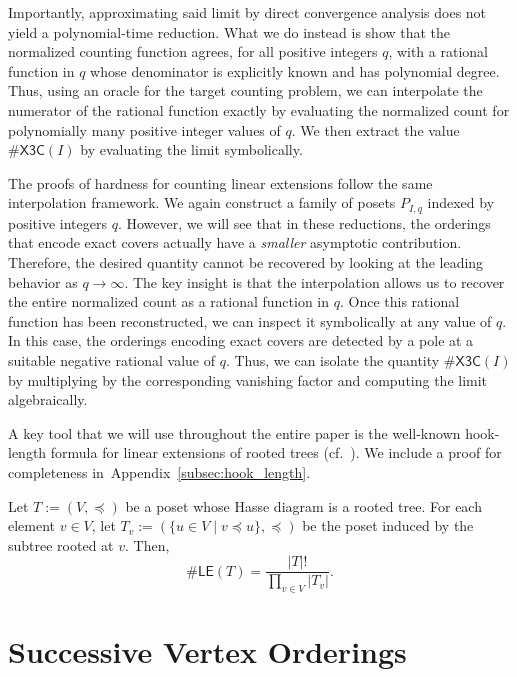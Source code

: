 \documentclass[11pt]{amsart}
\begin{document}
Importantly, approximating said limit by direct convergence analysis does not yield a polynomial-time reduction. What we do instead is show that the normalized counting function agrees, for all positive integers $q$, with a rational function in $q$ whose denominator is explicitly known and has polynomial degree. Thus, using an oracle for the target counting problem, we can interpolate the numerator of the rational function exactly by evaluating the normalized count for polynomially many positive integer values of $q$. We then extract the value  $\#\mathsf{X3C}(I)$ by evaluating the limit symbolically.

The proofs of hardness for counting linear extensions follow the same interpolation framework. We again construct a family of posets $P_{I,q}$ indexed by positive integers $q$. 
However, we will see that in these reductions, the orderings that encode exact covers actually have a \emph{smaller} asymptotic contribution. Therefore, the desired quantity cannot be recovered by looking at the leading behavior as $q \to \infty$. The key insight is that the interpolation allows us to recover the entire normalized count as a rational function in $q$. Once this rational function has been reconstructed, we can inspect it symbolically at any value of $q$. In this case, the orderings encoding exact covers are detected by a pole at a suitable negative rational value of $q$. Thus, we can isolate the quantity $\#\mathsf{X3C}(I)$ by multiplying by the corresponding vanishing factor and computing the limit algebraically.

A key tool that we will use throughout the entire paper is the well-known hook-length formula for linear extensions of rooted trees (cf.~\cite[Proposition 1]{gaoCountingShellingsComplete2021}). We include a proof for completeness in~Appendix~\ref{subsec:hook_length}.

\begin{lemma}\label{lemma:tree-le}
    Let $T := (V, \preceq)$ be a poset whose Hasse diagram is a rooted tree. For each element $v \in V$, let $T_v := (\{u \in V \mid v \preceq u\}, \preceq)$ be the poset induced by the subtree rooted at $v$.  Then,
    \[
    \#\mathsf{LE}(T) = \frac{|T|!}{\prod_{v \in V} |T_v|}.
    \]
\end{lemma}

\section{Successive Vertex Orderings}
\end{document}
